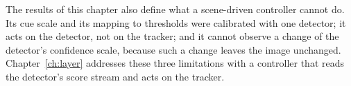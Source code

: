 The results of this chapter also define what a scene-driven controller cannot do. Its cue scale and its mapping to thresholds were calibrated with one detector; it acts on the detector, not on the tracker; and it cannot observe a change of the detector's confidence scale, because such a change leaves the image unchanged. Chapter~\ref{ch:layer} addresses these three limitations with a controller that reads the detector's score stream and acts on the tracker.

